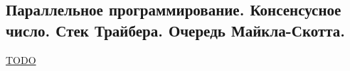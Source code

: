 \subsection{Параллельное программирование. Консенсусное число. Стек Трайбера. Очередь Майкла-Скотта.}

\href{https://www.babichev.org/tpmtp/Lecture09.pdf}{TODO}